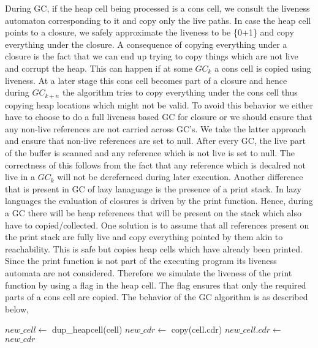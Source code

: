 \documentclass[10pt]{sigplanconf}
\begin{document}
During GC, if the heap cell being processed is a cons cell, we consult the liveness automaton 
corresponding to it and copy only the live paths. In case the heap cell points to a closure, 
we safely approximate the liveness to be {\{0+1\}\*} and copy everything under the closure.
A consequence of copying everything under a closure is the fact that we can end up trying to copy 
things which are not live and corrupt the heap. This can happen if at some $GC_k$ a cons cell is copied 
using liveness. At a later stage this cons cell becomes part of a closure and hence during $GC_{k+n}$ the 
algorithm tries to copy everything under the cons cell thus copying heap locations which might not be valid. 
To avoid this behavior we either have to choose to do a full liveness based GC for closure or we should 
ensure that any non-live references are not carried across GC's. We take the latter approach and ensure that 
non-live references are set to null. After every GC, the live part of the buffer is scanned and any reference 
which is not live is set to null. The correctness of this follows from the fact that any reference which is 
decalred not live in a $GC_k$ will not be derefernced during later execution.
Another difference that is present in GC of lazy lanaguage is the presence of a print stack. In lazy 
languages the evaluation of closures is driven by the print function. Hence, during a GC there will be 
heap references that will be present on the stack which also have to copied/collected. One solution is to 
assume that all references present on the print stack are fully live and copy everything pointed by them 
akin to reachability. This is safe but copies heap cells which have already been printed. Since the print 
function is not part of the executing program its liveness automata are not considered. Therefore we 
simulate the liveness of the print function by using a flag in the heap cell. The flag ensures that only the 
required parts of a cons cell are copied. The behavior of the GC algorithm is as described below,
\begin{algorithmic}
\STATE $new\_cell\gets$ dup\_heapcell(cell)
\STATE $new\_cdr\gets$ copy(cell.cdr)
\STATE $new\_cell.cdr\gets$ $new\_cdr$
\ENDIF
\end{algorithmic}
\end{document}
